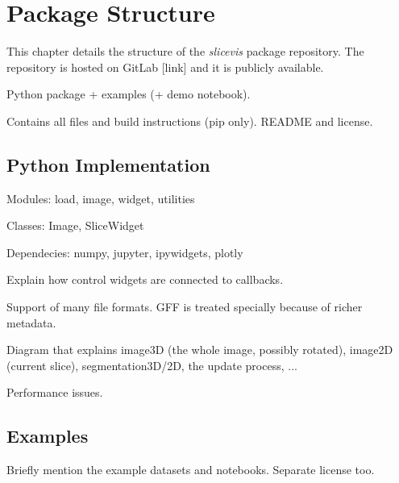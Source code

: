 \chapter{Package Structure}
This chapter details the structure of the \emph{slicevis} package repository. The repository is hosted on GitLab [link] and it is publicly available. 

Python package + examples (+ demo notebook).

Contains all files and build instructions (pip only). README and license.

\section{Python Implementation}

Modules: load, image, widget, utilities

Classes: Image, SliceWidget

Dependecies: numpy, jupyter, ipywidgets, plotly

Explain how control widgets are connected to callbacks.

Support of many file formats. GFF is treated specially because of richer metadata.

Diagram that explains image3D (the whole image, possibly rotated), image2D (current slice), segmentation3D/2D, the update process, ...

Performance issues.

\section{Examples}
Briefly mention the example datasets and notebooks. Separate license too.